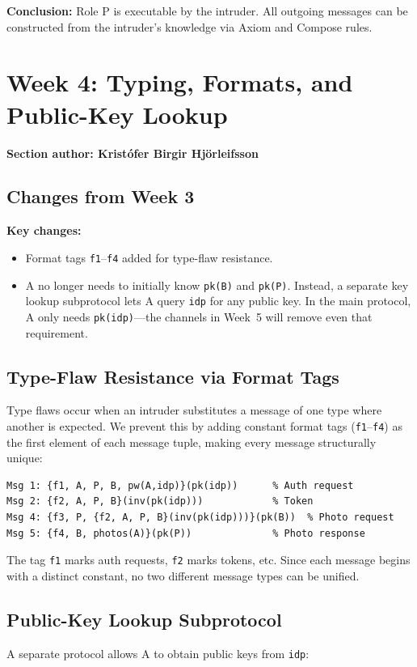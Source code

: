\documentclass[11pt,a4paper]{article}
\newcommand{\sectionauthor}[1]{\noindent\textbf{Section author: #1}\par\medskip}
\begin{document}
\textbf{Conclusion:} Role P is executable by the intruder. All outgoing messages can be
constructed from the intruder's knowledge via Axiom and Compose rules.

\section{Week 4: Typing, Formats, and Public-Key Lookup}
\sectionauthor{Kristófer Birgir Hjörleifsson}

\subsection{Changes from Week 3}
\textbf{Key changes:}
\begin{itemize}[leftmargin=*]
  \item Format tags \texttt{f1}--\texttt{f4} added for type-flaw resistance.
  \item A no longer needs to initially know \texttt{pk(B)} and \texttt{pk(P)}.
        Instead, a separate key lookup subprotocol lets A query \texttt{idp} for any
        public key. In the main protocol, A only needs \texttt{pk(idp)}---the channels
        in Week~5 will remove even that requirement.
\end{itemize}

\subsection{Type-Flaw Resistance via Format Tags}
Type flaws occur when an intruder substitutes a message of one type where another is expected.
We prevent this by adding constant format tags (\texttt{f1}--\texttt{f4}) as the first element of
each message tuple, making every message structurally unique:

\begin{lstlisting}[style=anb,caption={Week 4: Format-tagged messages}]
Msg 1: {f1, A, P, B, pw(A,idp)}(pk(idp))      % Auth request
Msg 2: {f2, A, P, B}(inv(pk(idp)))            % Token
Msg 4: {f3, P, {f2, A, P, B}(inv(pk(idp)))}(pk(B))  % Photo request
Msg 5: {f4, B, photos(A)}(pk(P))              % Photo response
\end{lstlisting}

The tag \texttt{f1} marks auth requests, \texttt{f2} marks tokens, etc. Since each message
begins with a distinct constant, no two different message types can be unified.

\subsection{Public-Key Lookup Subprotocol}
A separate protocol allows A to obtain public keys from \texttt{idp}:
\end{document}
